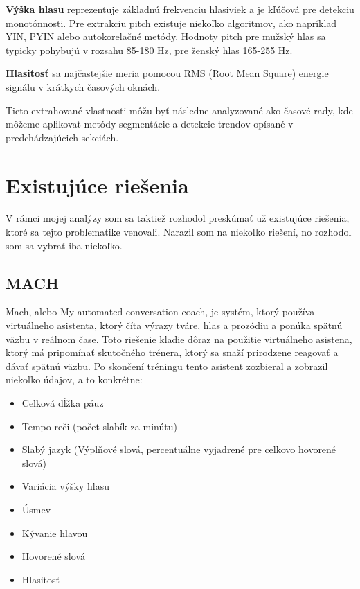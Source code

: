 \textbf{Výška hlasu} reprezentuje základnú frekvenciu hlasiviek a je kľúčová pre detekciu monotónnosti. Pre extrakciu pitch existuje niekoľko algoritmov, ako napríklad YIN, PYIN alebo autokorelačné metódy.\cite{yinAlgorithm} Hodnoty pitch pre mužský hlas sa typicky pohybujú v rozsahu 85-180 Hz, pre ženský hlas 165-255 Hz\cite{pitchRange}.

\textbf{Hlasitosť} sa najčastejšie meria pomocou RMS (Root Mean Square) energie signálu v krátkych časových oknách. \cite{rmsNormalization}

Tieto extrahované vlastnosti môžu byť následne analyzované ako časové rady, kde môžeme aplikovať metódy segmentácie a detekcie trendov opísané v predchádzajúcich sekciách.

\section{Existujúce riešenia}

V rámci mojej analýzy som sa taktiež rozhodol preskúmať už existujúce riešenia, ktoré sa tejto problematike venovali. Narazil som na niekoľko riešení, no rozhodol som sa vybrať iba niekoľko.

\subsection{MACH}

Mach, alebo My automated conversation coach, je systém, ktorý používa virtuálneho asistenta, ktorý číta výrazy tváre, hlas a prozódiu a ponúka spätnú väzbu v reálnom čase\cite{mach}. Toto riešenie kladie dôraz na použitie virtuálneho asistena, ktorý má pripomínať skutočného trénera, ktorý sa snaží prirodzene reagovať a dávať spätnú väzbu. Po skončení tréningu tento asistent zozbieral a zobrazil niekoľko údajov, a to konkrétne:
\begin{itemize}
    \item Celková dĺžka páuz
    \item Tempo reči (počet slabík za minútu)
    \item Slabý jazyk (Výplňové slová, percentuálne vyjadrené pre celkovo hovorené slová)
    \item Variácia výšky hlasu
    \item Úsmev
    \item Kývanie hlavou
    \item Hovorené slová
    \item Hlasitosť
\end{itemize}

